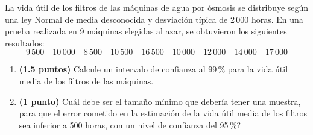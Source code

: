 
La vida útil de los filtros de las máquinas de agua por ósmosis se distribuye según una ley Normal de media desconocida y desviación típica de 2\,000 horas. En una prueba realizada en 9 máquinas elegidas al azar, se obtuvieron los siguientes resultados:
\[
9\,500\quad 10\,000\quad 8\,500\quad 10\,500\quad 16\,500\quad 10\,000\quad 12\,000\quad 14\,000\quad 17\,000
\]
\begin{enumerate}[label=\alph*),leftmargin=2.4em]
  \item \textbf{(1.5 puntos)} Calcule un intervalo de confianza al 99\,\% para la vida útil media de los filtros de las máquinas.
  \item \textbf{(1 punto)} \textquestiondown{}Cuál debe ser el tamaño mínimo que debería tener una muestra, para que el error cometido en la estimación de la vida útil media de los filtros sea inferior a 500 horas, con un nivel de confianza del 95\,\%?
\end{enumerate}
